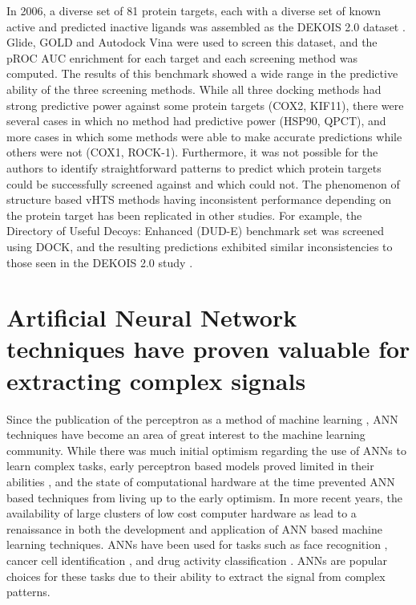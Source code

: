 In 2006, a diverse set of 81 protein targets, each with a diverse set of known active and predicted inactive ligands was assembled as the DEKOIS 2.0 dataset \citep{Bauer:2013de}.
Glide, \ac{GOLD} and Autodock Vina were used to screen this dataset, and the pROC AUC enrichment for each target and each screening method was computed.
The results of this benchmark showed a wide range in the predictive ability of the three screening methods.  
While all three docking methods had strong predictive power against some protein targets (COX2, KIF11), there were several cases in which no method had predictive power (HSP90, QPCT), and more cases in which some methods were able to make accurate predictions while others were not (COX1, ROCK-1).
Furthermore, it was not possible for the authors to identify straightforward patterns to predict which protein targets could be successfully screened against and which could not. 
The phenomenon of structure based \ac{vHTS} methods having inconsistent performance depending on the protein target has been replicated in other studies.
For example, the Directory of Useful Decoys: Enhanced (DUD-E) benchmark set was screened using DOCK, and the resulting predictions exhibited similar inconsistencies to those seen in the DEKOIS 2.0 study \citep{Mysinger:2012hu}.

\section{Artificial Neural Network techniques have proven valuable for extracting complex signals}

Since the publication of the perceptron as a method of machine learning \citep{Rosenblatt:1958jc}, \ac{ANN} techniques have become an area of great interest to the machine learning community.
While there was much initial optimism regarding the use of \ac{ANN}s to learn complex tasks, early perceptron based models proved limited in their abilities \citep{Gallant:1990hk}, and the state of computational hardware at the time prevented \ac{ANN} based techniques from living up to the early optimism.
In more recent years, the availability of large clusters of low cost computer hardware as lead to a renaissance in both the development and application of \ac{ANN} based machine learning techniques.
\ac{ANN}s have been used for tasks such as face recognition \citep{Zhao:2003bf}, cancer cell identification \citep{Zhou:2002ew}, and drug activity classification \citep{Gohlke:2002in}.
\ac{ANN}s are popular choices for these tasks due to their ability to extract the signal from complex patterns.

